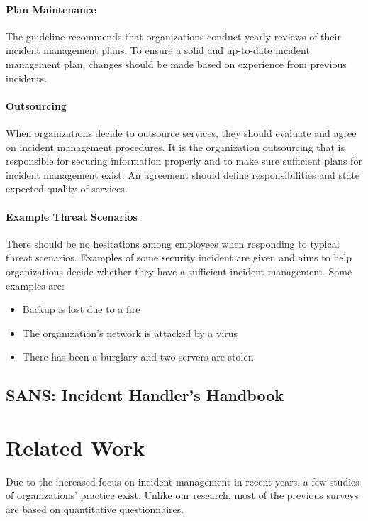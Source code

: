 \paragraph{Plan Maintenance}
The guideline recommends that organizations conduct yearly reviews of their incident management plans. To ensure a solid and up-to-date incident management plan, changes should be made based on experience from previous incidents. 

\paragraph{Outsourcing}
When organizations decide to outsource services, they should evaluate and agree on incident management procedures. It is the organization outsourcing that is responsible for securing information properly and to make sure sufficient plans for incident management exist. An agreement should define responsibilities and state expected quality of services. 

\paragraph{Example Threat Scenarios}
There should be no hesitations among employees when responding to typical threat scenarios. Examples of some security incident are given and aims to help organizations decide whether they have a sufficient incident management. Some examples are:
\begin{itemize}
\item Backup is lost due to a fire
\item The organization's network is attacked by a virus
\item There has been a burglary and two servers are stolen 
\end{itemize}







\subsection{SANS: Incident Handler's Handbook}

\section{Related Work}
Due to the increased focus on incident management in recent years, a few studies of organizations' practice exist. Unlike our research, most of the previous surveys are based on quantitative questionnaires.

